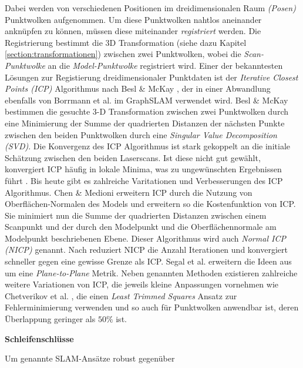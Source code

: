 Dabei werden von verschiedenen Positionen im dreidimensionalen Raum \emph{(Posen)} Punktwolken aufgenommen. Um diese Punktwolken nahtlos aneinander anknüpfen zu können, müssen diese miteinander \emph{registriert} werden. Die Registrierung bestimmt die 3D Transformation (siehe dazu Kapitel \ref{section:transformationen}) zwischen zwei Punktwolken, wobei die \emph{Scan-Punktwolke} an die \emph{Model-Punktwolke} registriert wird.
Einer der bekanntesten Lösungen zur Registierung dreidimensionaler Punktdaten ist der \emph{Iterative Closest Points (ICP)} Algorithmus nach Besl \& McKay \cite{besl1992method}, der in einer Abwandlung ebenfalls von Borrmann et al. im GraphSLAM \cite{borrmann2008globally} verwendet wird.
Besl \& McKay \cite{besl1992method} bestimmen die gesuchte 3-D Transformation zwischen zwei Punktwolken durch eine Minimierung der Summe der quadrierten Distanzen der nächsten Punkte zwischen den beiden Punktwolken durch eine \emph{Singular Value Decomposition (SVD)}.
Die Konvergenz des ICP Algorithmus ist stark gekoppelt an die initiale Schätzung zwischen den beiden Laserscans. Ist diese nicht gut gewählt, konvergiert ICP häufig in lokale Minima, was zu ungewünschten Ergebnissen führt \cite{he2017iterative}. 
Bis heute gibt es zahlreiche Varitationen und Verbesserungen des ICP Algorithmus.
Chen \& Medioni \cite{chen1992object} erweitern ICP durch die Nutzung von Oberflächen-Normalen des Models und erweitern so die Kostenfunktion von ICP. Sie minimiert nun die Summe der quadrierten Distanzen zwischen einem Scanpunkt und der durch den Modelpunkt und die Oberflächennormale am Modelpunkt beschriebenen Ebene. Dieser Algorithmus wird auch \emph{Normal ICP (NICP)} genannt. 
Nach \cite{he2017iterative} reduziert NICP die Anzahl Iterationen und konvergiert schneller  gegen eine gewisse Grenze als ICP.
Segal et al. \cite{segal2009generalized} erweitern die Ideen aus \cite{chen1992object} um eine \emph{Plane-to-Plane} Metrik.
Neben genannten Methoden existieren zahlreiche weitere Variationen von ICP, die jeweils kleine Anpassungen vornehmen wie Chetverikov et al. \cite{chetverikov2005robust}, die einen \emph{Least Trimmed Squares} Ansatz zur Fehlerminimierung verwenden und so auch für Punktwolken anwendbar ist, deren Überlappung geringer als $50\%$ ist.

\textbf{Schleifenschlüsse}

Um genannte SLAM-Ansätze robust gegenüber 

